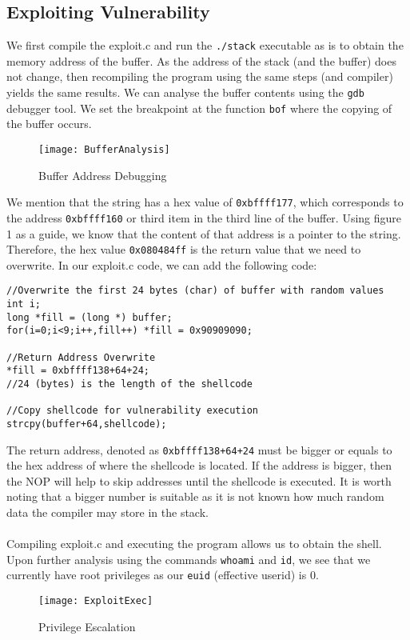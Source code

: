 \documentclass[a4paper,12pt]{article}
\begin{document}
\subsection{Exploiting Vulnerability}
We first compile the exploit.c and run the \texttt{./stack} executable as is to obtain the memory address of the buffer. As the address of the stack (and the buffer) does not change, then recompiling the program using the same steps (and compiler) yields the same results. We can analyse the buffer contents using the \texttt{gdb} debugger tool. We set the breakpoint at the function \texttt{bof} where the copying of the buffer occurs.
\begin{figure}[H]
	\centering
	\texttt{[image: BufferAnalysis]}
	\caption{Buffer Address Debugging}
	\label{fig:bufferanalysis}
\end{figure}
\noindent We mention that the string has a hex value of \texttt{0xbffff177}, which corresponds to the address \texttt{0xbffff160} or third item in the third line of the buffer. Using figure 1 as a guide, we know that the content of that address is a pointer to the string. Therefore, the hex value \texttt{0x080484ff} is the return value that we need to overwrite.
In our exploit.c code, we can add the following code:
\begin{verbatim}
//Overwrite the first 24 bytes (char) of buffer with random values
int i;
long *fill = (long *) buffer;
for(i=0;i<9;i++,fill++) *fill = 0x90909090;

//Return Address Overwrite
*fill = 0xbffff138+64+24;
//24 (bytes) is the length of the shellcode

//Copy shellcode for vulnerability execution
strcpy(buffer+64,shellcode);
\end{verbatim}
The return address, denoted as \texttt{0xbffff138+64+24} must be bigger or equals to the hex address of where the shellcode is located. If the address is bigger, then the NOP will help to skip addresses until the shellcode is executed. It is worth noting that a bigger number is suitable as it is not known how much random data the compiler may store in the stack.\\\\Compiling exploit.c and executing the program allows us to obtain the shell. Upon further analysis using the commands \texttt{whoami} and \texttt{id}, we see that we currently have root privileges as our \texttt{euid} (effective userid) is 0.
\begin{figure}[H]
	\centering
	\texttt{[image: ExploitExec]}
	\caption{Privilege Escalation}
	\label{fig:exploitexec}
\end{figure}
\end{document}
